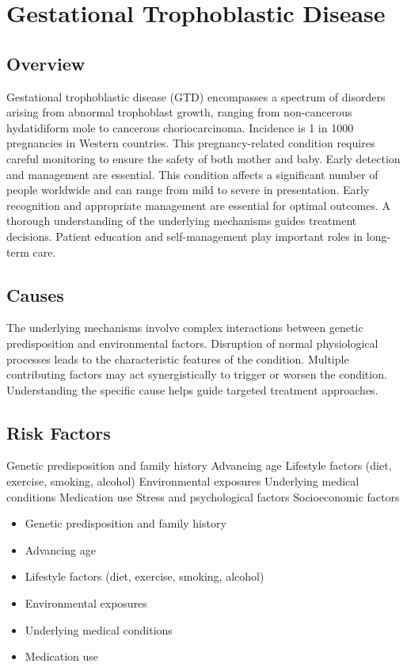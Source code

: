 \chapter{Gestational Trophoblastic Disease}
\label{sec:Gestational Trophoblastic Disease}

\section{Overview}
Gestational trophoblastic disease (GTD) encompasses a spectrum of disorders arising from abnormal trophoblast growth, ranging from non-cancerous hydatidiform mole to cancerous choriocarcinoma. Incidence is 1 in 1000 pregnancies in Western countries. This pregnancy-related condition requires careful monitoring to ensure the safety of both mother and baby. Early detection and management are essential. This condition affects a significant number of people worldwide and can range from mild to severe in presentation. Early recognition and appropriate management are essential for optimal outcomes. A thorough understanding of the underlying mechanisms guides treatment decisions. Patient education and self-management play important roles in long-term care.
\section{Causes}
The underlying mechanisms involve complex interactions between genetic predisposition and environmental factors. Disruption of normal physiological processes leads to the characteristic features of the condition. Multiple contributing factors may act synergistically to trigger or worsen the condition. Understanding the specific cause helps guide targeted treatment approaches.
\section{Risk Factors}
Genetic predisposition and family history Advancing age Lifestyle factors (diet, exercise, smoking, alcohol) Environmental exposures Underlying medical conditions Medication use Stress and psychological factors Socioeconomic factors

\begin{itemize}[noitemsep]
  \item Genetic predisposition and family history
  \item Advancing age
  \item Lifestyle factors (diet, exercise, smoking, alcohol)
  \item Environmental exposures
  \item Underlying medical conditions
  \item Medication use
\end{itemize}
